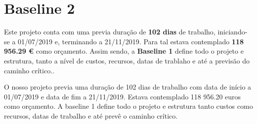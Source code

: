 \section{Baseline 2}

Este projeto conta com uma previa duração de \textbf{102 dias} de trabalho, iniciando-se a 01/07/2019 e, terminando a 21/11/2019. Para tal estava contemplado \textbf{118 956.29 \euro} como orçamento. Assim sendo, a \textbf{Baseline 1} define todo o projeto e estrutura, tanto a nível de custos, recursos, datas de trablaho e até a previsão do caminho crítico..

\hspace{3cm}

O nosso projeto previa uma duração de 102 dias de trabalho com data de início a 01/07/2019 e data de fim a 21/11/2019. Estava contemplado 118 956.20 euros como orçamento. A baseline 1 define todo o projeto e estrutura tanto custos como recursos, datas de trabalho e até prevê o caminho crítico.
